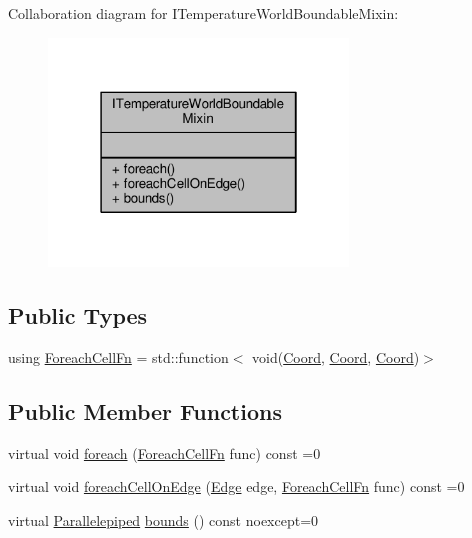 Collaboration diagram for I\-Temperature\-World\-Boundable\-Mixin\-:
\nopagebreak
\begin{figure}[H]
\begin{center}
\leavevmode
\includegraphics[width=226pt]{class_i_temperature_world_boundable_mixin__coll__graph}
\end{center}
\end{figure}
\subsection*{Public Types}
\begin{DoxyCompactItemize}
\item 
using \hyperlink{class_i_temperature_world_boundable_mixin_a370c20d79642d15e97843da972d87ba9}{Foreach\-Cell\-Fn} = std\-::function$<$ void(\hyperlink{struct_coord}{Coord}, \hyperlink{struct_coord}{Coord}, \hyperlink{struct_coord}{Coord})$>$
\end{DoxyCompactItemize}
\subsection*{Public Member Functions}
\begin{DoxyCompactItemize}
\item 
virtual void \hyperlink{class_i_temperature_world_boundable_mixin_ac350b2e2ea22a229e6543d55e3217317}{foreach} (\hyperlink{class_i_temperature_world_boundable_mixin_a370c20d79642d15e97843da972d87ba9}{Foreach\-Cell\-Fn} func) const =0
\item 
virtual void \hyperlink{class_i_temperature_world_boundable_mixin_a3b7ec1fc071ac95a6f6fe98b9f4bd2da}{foreach\-Cell\-On\-Edge} (\hyperlink{_edge_8hpp_a5be7c8fa582f7b873d1c6caacb633073}{Edge} edge, \hyperlink{class_i_temperature_world_boundable_mixin_a370c20d79642d15e97843da972d87ba9}{Foreach\-Cell\-Fn} func) const =0
\item 
virtual \hyperlink{struct_parallelepiped}{Parallelepiped} \hyperlink{class_i_temperature_world_boundable_mixin_a4811acd7f2bade56752c6326b0860f0c}{bounds} () const noexcept=0
\end{DoxyCompactItemize}


